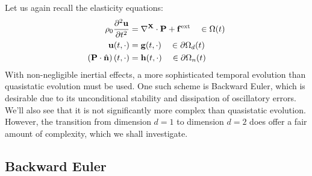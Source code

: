 Let us again recall the elasticity equations:
\begin{subequations}\label{eq:elasticity.ii}
\begin{align}
\rho_0 \frac{\partial^2 \mathbf{u}}{\partial t^2} & = \nabla^{\mathbf{X}} \cdot \mathbf{P} + \mathbf{f}^{\text{ext}} \quad \in \Omega(t) \\
\mathbf{u}(t,\cdot) & = \mathbf{g}(t,\cdot) \quad \in \partial \Omega_d(t) \\
\left( \mathbf{P} \cdot \hat{\mathbf{n}} \right) (t,\cdot) & = \mathbf{h}(t,\cdot) \quad \in \partial \Omega_n(t)
\end{align}
\end{subequations}
With non-negligible inertial effects, a more sophisticated temporal evolution than quasistatic evolution must be used. One such scheme is Backward Euler, which is desirable due to its unconditional stability and dissipation of oscillatory errors. We'll also see that it is not significantly more complex than quasistatic evolution. However, the transition from dimension $d = 1$ to dimension $d = 2$ does offer a fair amount of complexity, which we shall investigate.

\subsection{Backward Euler}

